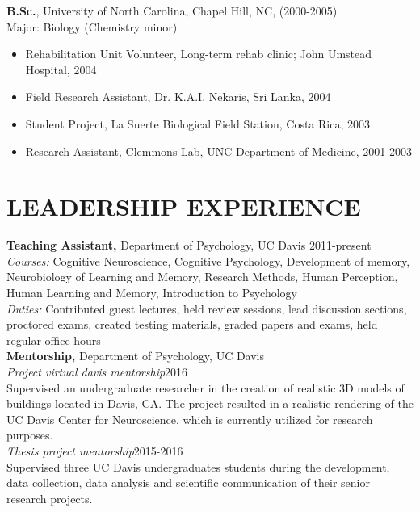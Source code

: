 \documentclass[line,margin,10pt]{res}
\begin{document}
\begin{resume}
\textbf{B.Sc.}, University of North Carolina, Chapel Hill, NC, (2000-2005)\\
Major: Biology (Chemistry minor)\\
\begin{itemize} \itemsep -2pt
\item	Rehabilitation Unit Volunteer, Long-term rehab clinic; John Umstead Hospital, 2004
\item	Field Research Assistant, Dr. K.A.I. Nekaris, Sri Lanka, 2004
\item	Student Project, La Suerte Biological Field Station, Costa Rica, 2003
\item	Research Assistant, Clemmons Lab, UNC Department of Medicine, 2001-2003
\end{itemize}								

\section{LEADERSHIP EXPERIENCE}
 \textbf{Teaching Assistant,} Department of Psychology, UC Davis \hfill 2011-present \\
\emph{Courses:} Cognitive Neuroscience, Cognitive Psychology, Development of memory, Neurobiology of Learning and Memory, Research Methods, Human Perception, Human Learning and Memory, Introduction to Psychology\\
\emph{Duties:} Contributed guest lectures, held review sessions, lead discussion sections, proctored exams, created testing materials, graded papers and exams, held regular office hours\\
\textbf{Mentorship,} Department of Psychology, UC Davis \\
\emph{Project virtual davis mentorship}\hfill 2016 \\
Supervised an undergraduate researcher in the creation of realistic 3D models of buildings located in Davis, CA. The project resulted in a realistic rendering of the UC Davis Center for Neuroscience, which is currently utilized for research purposes.\\
\emph{Thesis project mentorship}\hfill 2015-2016 \\
Supervised three UC Davis undergraduates students during the development, data collection, data analysis and scientific communication of their senior research projects.\\



\end{resume}
\end{document}
